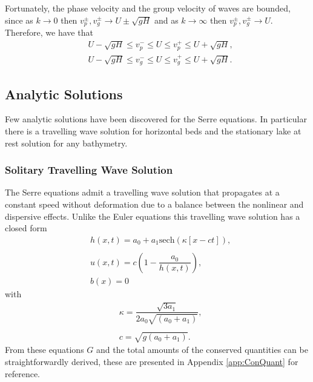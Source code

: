 Fortunately, the phase velocity and the group velocity of waves are bounded, since as $k \rightarrow 0$ then $v_p^\pm,v_g^\pm \rightarrow U \pm \sqrt{gH}$ and as $k \rightarrow \infty$ then  $v_p^\pm,v_g^\pm \rightarrow U$. Therefore, we have that
\begin{subequations}
\begin{align}
&U - \sqrt{gH} \le v_p^- \le U \le v_p^+ \le U + \sqrt{gH}, \label{eqn:WaveVelocitiesBound} \\
&U - \sqrt{gH} \le v_g^- \le U \le v_g^+ \le U + \sqrt{gH}.
\end{align}
\end{subequations}

\subsection{Analytic Solutions}
Few analytic solutions have been discovered for the Serre equations. In particular there is a travelling wave solution for horizontal beds \cite{El-etal-2006} and the stationary lake at rest solution for any bathymetry.


\subsubsection{Solitary Travelling Wave Solution}
The Serre equations admit a travelling wave solution that propagates at a constant speed without deformation due to a balance between the nonlinear and dispersive effects. Unlike the Euler equations this travelling wave solution has a closed form
\begin{subequations}
	\begin{align}
	&h(x,t) = a_0 + a_1\text{sech}\left(\kappa \left[x - ct\right]\right), \\  \nonumber \\
	&u(x,t) = c\left(1 - \dfrac{a_0}{h(x,t)}\right), \\
	&b(x) = 0
	\end{align}
	\label{eqn:Solitondefhub}
\end{subequations}
with
\begin{align*}
&\kappa = \dfrac{\sqrt{3a_1}}{2 a_0\sqrt{\left(a_0 + a_1\right)}}, \\ \\
&c = \sqrt{g(a_0 + a_1)}.
\end{align*}
From these equations $G$ and the total amounts of the conserved quantities can be straightforwardly derived, these are presented in Appendix \ref{app:ConQuant} for reference. 

